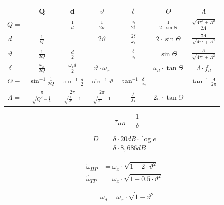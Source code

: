 \documentclass[a4paper, 12pt]{report}
\begin{document}
	\begin{table}[h]
    	\def\arraystretch{1.5}
{\large         \begin{tabular}{|c|c|c|c|c|c|c|}
        \hline
        ~ & Q & d & $\vartheta$ & $\delta$ & $\varTheta$ & $\Lambda$ \\ \hline
        $ Q= $ & ~ & $\frac{1}{d}$ & $\frac{1}{2\vartheta}$ & $\frac{\omega_x}{2\delta}$ & $\frac{1}{2 \cdot \sin{\varTheta}}$ & $\frac{\sqrt{4\pi^2+\Lambda^2}}{2\Lambda}$ \\ \hline
        $ d= $ & $\frac{1}{Q}$ & ~ & $2\vartheta$ & $\frac{2\delta}{\omega_x}$ & $2\cdot\sin{\varTheta}$ & $\frac{2\Lambda}{\sqrt{4\pi^2+\Lambda^2}}$ \\ \hline
        $ \vartheta= $ & $\frac{1}{2Q}$ & $\frac{d}{2}$ & ~ & $\frac{\delta}{\omega_x}$ & $\sin{\varTheta}$ & $\frac{\Lambda}{\sqrt{4\pi^2+\Lambda^2}}$ \\ \hline
        $ \delta= $ & $\frac{\omega_x}{2Q}$ & $\frac{\omega_x d}{2}$ & $\vartheta\cdot\omega_x$ & ~ & $\omega_d\cdot\tan{\varTheta}$ & $\Lambda \cdot f_d$ \\ \hline
        $ \varTheta= $ & $\sin^{-1}{\frac{1}{2Q}}$ & $\sin^{-1}{\frac{d}{2}}$ & $\sin^{-1}{\vartheta}$ & $\tan^{-1}{\frac{\delta}{\omega_d}}$ & ~ & $\tan^{-1}{\frac{\Lambda}{2\pi}}$ \\ \hline
        $ \Lambda= $ & $\frac{\pi}{\sqrt{Q^2-\frac{1}{4}}}$ & $\frac{2\pi}{\sqrt{\frac{4}{d^2}-1}}$ & $\frac{2\pi}{\sqrt{\frac{1}{\vartheta^2}-1}}$ & $\frac{\delta}{f_d}$ & $2\pi \cdot \tan{\varTheta}$ & ~ \\ \hline
        \end{tabular}
}    \end{table}

	\begin{minipage}[t]{0.2\textwidth}
		\vspace{-0.2cm}
		\[  \tau_{HK} = \frac{1}{\delta}  \]
	\end{minipage} 
	\begin{minipage}[t]{0.4\textwidth}
		\vspace{-0.4cm}
		\begin{align*}
			D &= \delta \cdot 20dB \cdot \log{e} &\\
			&= \delta \cdot 8,686dB &
		\end{align*}
	\end{minipage}
	\begin{minipage}[t]{0.4\textwidth}
		\vspace{-0.4cm}
		\begin{align*}
			\hat{\omega}_{HP} &= \omega_x \cdot \sqrt{1-2\cdot\vartheta^2} &\\
			\hat{\omega}_{TP} &= \omega_x \cdot \sqrt{1-0.5\cdot\vartheta^2} &
		\end{align*}
	\end{minipage}
	\[ \omega_d = \omega_x \cdot \sqrt{1-\vartheta^2} \]
	
\clearpage
\end{document}
